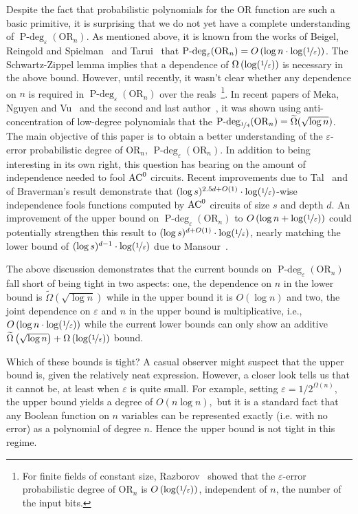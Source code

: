 \documentclass[10pt,a4paper]{article}
\theoremstyle{plain}
\theoremstyle{definition}
\renewcommand{\epsilon}{\varepsilon}
\newcommand{\eps}{\epsilon}
\newcommand{\OR}{\mathrm{OR}}
\newcommand{\AC}{\mbox{\rm AC}}
\newcommand{\pdeg}{\operatorname{P-deg}}
\newcommand{\cbra}[1]{\left(#1\right)}
\newcommand{\bigo}[1]{O\left(#1\right)}
\newcommand{\lepsinv}{\log(\nicefrac1\eps)}
\newcommand{\Omegatilde}[1]{\widetilde\Omega \cbra{#1}}
\newcommand{\bigomega}[1]{\Omega\cbra{#1}}
\newcommand{\quarter}{\nicefrac{1}{4}}
\begin{document}
Despite the fact that probabilistic polynomials for the $\OR$ function
are such a basic
primitive, it is surprising that we do not yet have a complete
understanding of $\pdeg_\eps(\OR_n)$. As mentioned above, it is known from
the works of Beigel, Reingold and Spielman~\cite{BeigelRS1991} and
Tarui~\cite{Tarui1993} that $\pdeg_\eps(\OR_n) = \bigo{\log n \cdot \lepsinv}$.  
The Schwartz-Zippel lemma implies that a dependence of $\bigomega{\lepsinv}$ is necessary in the above bound.
However, until recently, it wasn't clear whether any dependence on $n$ is required
in $\pdeg_\eps(\OR_n)$ over the reals~\footnote{For finite fields of constant size,
Razborov~\cite{Razborov1987} showed that the $\varepsilon$-error
probabilistic degree of $\OR_n$ is $\bigo{\lepsinv}$,
independent of $n$, the number of the input bits.}. In recent papers of
Meka, Nguyen and Vu~\cite{MekaNV2016} and the second and last author~\cite{HarshaS2019-ac0}, 
it was shown using anti-concentration of low-degree polynomials that the 
$\pdeg_{\quarter}(\OR_n) = \widetilde{\Omega}(\sqrt{\log n})$. The main objective of this paper
is to obtain a better understanding of the $\eps$-error probabilistic
degree of $\OR_n$, $\pdeg_\eps(\OR_n)$. In addition to being
interesting in its own right, this question has bearing on the amount
of independence needed to fool $\AC^0$ circuits. Recent improvements
due to Tal~\cite{Tal2017} and~\cite{HarshaS2019-ac0} of Braverman's result demonstrate that
$(\log s)^{2.5d +\bigo{1}}\cdot \lepsinv$-wise independence fools functions
computed by $\AC^0$ circuits of size $s$ and depth $d$. An improvement
of the upper bound on $\pdeg_\eps(\OR_n)$ to $\bigo{\log n +
\lepsinv}$ could potentially strengthen this result to $(\log s)^{d +\bigo{1}}\cdot
\lepsinv$, nearly matching the lower bound of $(\log s)^{d-1}\cdot \lepsinv$ due to Mansour~\cite{LubyV1996}. 

The above discussion demonstrates that the current bounds on $\pdeg_{\varepsilon}(\OR_n)$ 
fall short of being tight in two aspects: one, the dependence on $n$ in the lower bound is
$\Omegatilde{\sqrt{\log n}}$ while in the upper bound it is $\bigo{\log
n}$ and two, the joint dependence on $\eps$ and $n$ in the upper bound
is multiplicative, i.e., $\bigo{\log n \cdot \lepsinv}$ while the
current lower bounds can only show an additive
$\Omegatilde{\sqrt{\log n}} + 
\bigomega{\lepsinv}$ bound.

Which of these bounds is tight? A casual observer might suspect that the upper bound is, 
given the relatively neat expression. However, a closer look tells us  that it cannot be, 
at least when $\varepsilon$ is quite small. For example, setting $\varepsilon = 1/2^{\Omega(n)}$, 
the upper bound yields a degree of $O(n\log n),$ but it is a standard fact that any Boolean function 
on $n$ variables can be represented exactly (i.e. with no error) as a polynomial of degree $n$. 
Hence the upper bound is not tight in this regime. 
\end{document}
